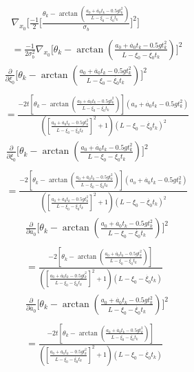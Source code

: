 \documentclass[11pt]{article}
\begin{document}
\begin{align*}
    \nabla_{x_0}\Big[\frac{-1}{2}\Big[\frac{\theta_k - \arctan(\frac{a_0 + \dot{a_0}t_k - 0.5gt_k^2}{L-\xi_0-\dot{\xi_0}t_k})}{\sigma_b}\Big]^2\Big] \\ \\
    = \frac{-1}{2\sigma_b^2} \nabla_{x_0} \Big[\theta_k - \arctan(\frac{a_0 + \dot{a_0}t_k - 0.5gt_k^2}{L-\xi_0-\dot{\xi_0}t_k})\Big]^2
\end{align*}
\begin{align*}
    \frac{\partial}{\partial \xi_0} \Big[\theta_k - \arctan(\frac{a_0 + \dot{a_0}t_k - 0.5gt_k^2}{L-\xi_0-\dot{\xi_0}t_k})\Big]^2 \\ \\
    = \frac{-2t[\theta_k - \arctan(\frac{a_0 + \dot{a_0}t_k - 0.5gt_k^2}{L-\xi_0-\dot{\xi_0}t_k})](a_o+\dot{a_0}t_k-0.5gt_k^2)}{([\frac{a_0 + \dot{a_0}t_k - 0.5gt_k^2}{L-\xi_0-\dot{\xi_0}t_k}]^2 + 1)(L-\xi_0-\dot{\xi_0}t_k)^2}
\end{align*}
\begin{align*}
    \frac{\partial}{\partial \dot{\xi_0}} \Big[\theta_k - \arctan(\frac{a_0 + \dot{a_0}t_k - 0.5gt_k^2}{L-\xi_0-\dot{\xi_0}t_k})\Big]^2 \\ \\
    = \frac{-2[\theta_k - \arctan(\frac{a_0 + \dot{a_0}t_k - 0.5gt_k^2}{L-\xi_0-\dot{\xi_0}t_k})](a_o+\dot{a_0}t_k-0.5gt_k^2)}{([\frac{a_0 + \dot{a_0}t_k - 0.5gt_k^2}{L-\xi_0-\dot{\xi_0}t_k}]^2 + 1)(L-\xi_0-\dot{\xi_0}t_k)^2}
\end{align*}
\begin{align*}
    \frac{\partial}{\partial a_0} \Big[\theta_k - \arctan(\frac{a_0 + \dot{a_0}t_k - 0.5gt_k^2}{L-\xi_0-\dot{\xi_0}t_k})\Big]^2 \\ \\
    = \frac{-2[\theta_k - \arctan(\frac{a_0 + \dot{a_0}t_k - 0.5gt_k^2}{L-\xi_0-\dot{\xi_0}t_k})]}{([\frac{a_0 + \dot{a_0}t_k - 0.5gt_k^2}{L-\xi_0-\dot{\xi_0}t_k}]^2 + 1)(L-\xi_0-\dot{\xi_0}t_k)}
\end{align*}
\begin{align*}
    \frac{\partial}{\partial \dot{a_0}} \Big[\theta_k - \arctan(\frac{a_0 + \dot{a_0}t_k - 0.5gt_k^2}{L-\xi_0-\dot{\xi_0}t_k})\Big]^2 \\ \\
    = \frac{-2t[\theta_k - \arctan(\frac{a_0 + \dot{a_0}t_k - 0.5gt_k^2}{L-\xi_0-\dot{\xi_0}t_k})]}{([\frac{a_0 + \dot{a_0}t_k - 0.5gt_k^2}{L-\xi_0-\dot{\xi_0}t_k}]^2 + 1)(L-\xi_0-\dot{\xi_0}t_k)}
\end{align*}
\end{document}
